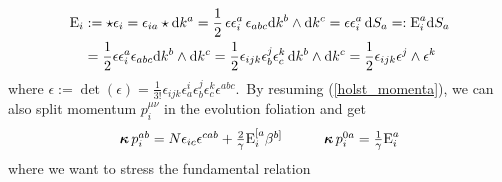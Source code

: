 \begin{equation}\label{densitized_triad}
    \begin{split}
    \text{\normalfont E}_i&:=\star\epsilon_i=\epsilon_{ia}\star\text{\normalfont d} k^a=\frac{1}{2}\,\epsilon\epsilon^a_i\,\epsilon_{abc}\text{\normalfont d} k^b\wedge\text{\normalfont d} k^c=\epsilon\epsilon^a_i\,\text{\normalfont d} S_a=:\text{\normalfont E}_i^a\text{\normalfont d} S_a\\
    &=\frac{1}{2}\epsilon\epsilon^a_i\epsilon_{abc}\text{\normalfont d} k^b\wedge\text{\normalfont d} k^c=\frac{1}{2}\epsilon_{ijk}\epsilon^j_b\epsilon^k_c\,\text{\normalfont d} k^b\wedge\text{\normalfont d} k^c=\frac{1}{2}\epsilon_{ijk}\epsilon^j\wedge\epsilon^k
\end{split}
\end{equation}
where $\epsilon:=\det(\epsilon)=\frac{1}{3!}\epsilon_{ijk}\epsilon^i_a\epsilon^j_b\epsilon^k_c\epsilon^{abc}$.\, By resuming (\ref{holst_momenta}), we can also split momentum $p^{\mu\nu}_i$ in the evolution foliation and get
$$
    \begin{matrix}
    \boldsymbol{\kappa}\, p^{ab}_i=N\epsilon_{ic}\epsilon^{cab}+\frac{2}{\gamma}\text{\normalfont E}_i^{[a}\beta^{b]}\quad&\quad
    \boldsymbol{\kappa}\, p^{0a}_i=\frac{1}{\gamma}\text{\normalfont E}^a_i\\
\end{matrix}
$$
where we want to stress the fundamental relation

